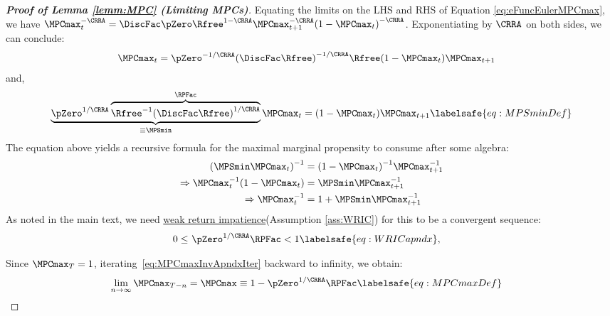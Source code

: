\documentclass[\econtexRoot/BufferStockTheory]{subfiles}
\begin{document}
\begin{proof}[\textbf{Proof of Lemma \ref{lemm:MPC} (Limiting MPCs)}]
Equating the limits on the LHS and RHS of Equation \eqref{eq:eFuncEulerMPCmax}, we have $\MPCmax_{t}^{-\CRRA }=\DiscFac
\pZero\Rfree^{1-\CRRA }\MPCmax_{t+1}^{-\CRRA }{(1-\MPCmax
_{t})}^{-\CRRA }$.
Exponentiating by $\CRRA$ on both sides, we can conclude:
%
%
\begin{equation}\label{eq:mpcmaxiter}\begin{gathered}\begin{aligned}
\MPCmax_{t} & = \pZero^{-1/\CRRA} {(\DiscFac
\Rfree)}^{-1/\CRRA}\Rfree(1-\MPCmax _{t})\MPCmax _{t+1} \notag
\end{aligned}\end{gathered}\end{equation}
%
%
and, 
%
%
\begin{equation}
 \underbrace{\pZero^{1/\CRRA}\overbrace{{\Rfree}^{-1}{(\DiscFac
    \Rfree)}^{1/\CRRA}}^{\RPFac}}_{\equiv \MPSmin} \MPCmax_{t}  = (1-\MPCmax _{t})\MPCmax _{t+1} \labelsafe{eq:MPSminDef}
\end{equation}
%
%
The equation above yields a recursive formula for the maximal marginal propensity to consume after some algebra:
%
%
\begin{equation}\begin{gathered}\begin{aligned}
  {(\MPSmin \MPCmax_{t})}^{-1}  & = {(1-\MPCmax_{t})}^{-1}\MPCmax_{t+1}^{-1}  \notag
\\ \Rightarrow \MPCmax_{t}^{-1}(1-\MPCmax_{t})  & = \MPSmin \MPCmax_{t+1}^{-1}   \notag
\\ \Rightarrow  \MPCmax_{t}^{-1}  & = 1+\MPSmin \MPCmax_{t+1}^{-1} \label{eq:MPCmaxInvApndxIter}
\end{aligned}\end{gathered}\end{equation}
%
%
As noted in the main text, we need \hyperlink{WRIC}{weak return impatience}(Assumption \ref{ass:WRIC}) for this to be a convergent sequence:
\begin{equation}\begin{gathered}\begin{aligned}
  0 \leq & ~\pZero^{1/\CRRA} \RPFac < 1 \labelsafe{eq:WRICapndx},
\end{aligned}\end{gathered}\end{equation}

Since $\MPCmax_{T}=1$, iterating~\eqref{eq:MPCmaxInvApndxIter} backward to
infinity, we obtain:
\begin{equation}\begin{gathered}\begin{aligned}
\lim_{n\rightarrow\infty}\MPCmax_{T-n} 
& = \MPCmax \equiv 1-\pZero^{1/\CRRA}\RPFac  \labelsafe{eq:MPCmaxDef}
\end{aligned}\end{gathered}\end{equation}


\end{proof}
\end{document}
